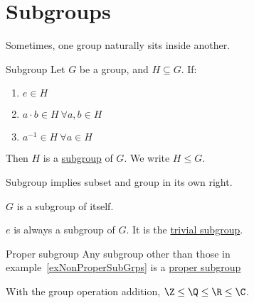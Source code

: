 \documentclass[../Main.tex]{subfiles}
\begin{document}
\section{Subgroups}
Sometimes, one group naturally sits inside another.
\begin{definition}{Subgroup}
    Let $G$ be a group, and $H \subseteq G$. If:
    \begin{enumerate}
        \item $e \in H$
        \item $a \cdot b \in H~\forall a, b \in H$
        \item $a^{-1} \in H~\forall a \in H$
    \end{enumerate}
    Then $H$ is a \underline{subgroup} of $G$. We write $H \leq G$.
\end{definition}
Subgroup implies subset and group in its own right.
\begin{examples}{
        \label{exNonProperSubGrps}
    }
    \item $G$ is a subgroup of itself.
    \item $e$ is always a subgroup of $G$. It is the \underline{trivial subgroup}.
\end{examples}
\begin{definition}{Proper subgroup}
    Any subgroup other than those in example~\ref{exNonProperSubGrps} is a \underline{proper subgroup}
\end{definition}
With the group operation addition, $\Z \leq \Q \leq \R \leq \C$.
\end{document}
